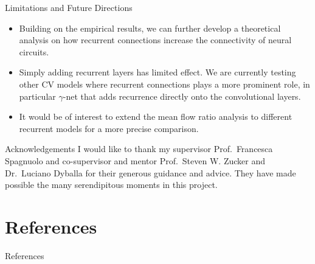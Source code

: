 \documentclass[xcolor={dvipsnames,svgnames}]{beamer}
\begin{document}
\begin{frame}{Limitations and Future Directions}
\begin{itemize}
    
    \item Building on the empirical results, we can further develop a theoretical analysis on how recurrent connections increase the connectivity of neural circuits. 
    \item Simply adding recurrent layers has limited effect. We are currently testing other CV models where recurrent connections plays a more prominent role, in particular $\gamma$-net \cite{serre-recurrence} that adds recurrence directly onto the convolutional layers.
    \item It would be of interest to extend the mean flow ratio analysis to different recurrent models for a more precise comparison. 
\end{itemize}
\end{frame}

\begin{frame}{Acknowledgements}
I would like to thank my supervisor Prof.~Francesca Spagnuolo  and co-supervisor and mentor Prof.~Steven W. Zucker and Dr.~Luciano Dyballa for their generous guidance and advice. They have made possible the many serendipitous moments in this project. 
\end{frame}
\section{References}
\begin{frame}[allowframebreaks]{References}
\tiny


\end{frame}
\end{document}
